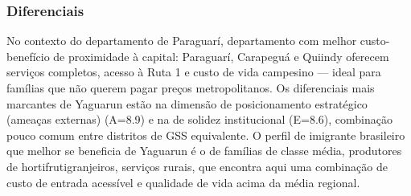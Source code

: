 \subsubsection*{Diferenciais}\label{dif-yaguarun-0917}
No contexto do departamento de Paraguarí, departamento com melhor custo-benefício de proximidade à capital: Paraguarí, Carapeguá e Quiindy oferecem serviços completos, acesso à Ruta 1 e custo de vida campesino — ideal para famílias que não querem pagar preços metropolitanos. Os diferenciais mais marcantes de Yaguarun estão na dimensão de posicionamento estratégico (ameaças externas) (A=8.9) e na de solidez institucional (E=8.6), combinação pouco comum entre distritos de GSS equivalente. O perfil de imigrante brasileiro que melhor se beneficia de Yaguarun é o de famílias de classe média, produtores de hortifrutigranjeiros, serviços rurais, que encontra aqui uma combinação de custo de entrada acessível e qualidade de vida acima da média regional.
